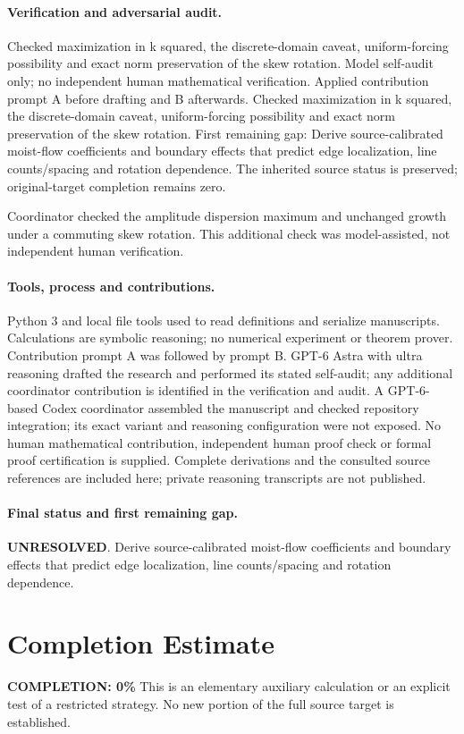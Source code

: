 \documentclass[11pt]{article}
\begin{document}
\paragraph{Verification and adversarial audit.}
Checked maximization in k squared, the discrete-domain caveat, uniform-forcing possibility and exact norm preservation of the skew rotation. Model self-audit only; no independent human mathematical verification. Applied contribution prompt A before drafting and B afterwards. Checked maximization in k squared, the discrete-domain caveat, uniform-forcing possibility and exact norm preservation of the skew rotation. First remaining gap: Derive source-calibrated moist-flow coefficients and boundary effects that predict edge localization, line counts/spacing and rotation dependence. The inherited source status is preserved; original-target completion remains zero.

Coordinator checked the amplitude dispersion maximum and unchanged growth under a commuting skew rotation. This additional check was model-assisted, not independent human verification.

\paragraph{Tools, process and contributions.}
Python 3 and local file tools used to read definitions and serialize manuscripts. Calculations are symbolic reasoning; no numerical experiment or theorem prover. Contribution prompt A was followed by prompt B. GPT-6 Astra with ultra reasoning drafted the research and performed its stated self-audit; any additional coordinator contribution is identified in the verification and audit. A GPT-6-based Codex coordinator assembled the manuscript and checked repository integration; its exact variant and reasoning configuration were not exposed. No human mathematical contribution, independent human proof check or formal proof certification is supplied. Complete derivations and the consulted source references are included here; private reasoning transcripts are not published.

\paragraph{Final status and first remaining gap.}
\textbf{UNRESOLVED}. Derive source-calibrated moist-flow coefficients and boundary effects that predict edge localization, line counts/spacing and rotation dependence.

\section{Completion Estimate}
\noindent\textbf{COMPLETION: 0\%}
This is an elementary auxiliary calculation or an explicit test of a restricted strategy. No new portion of the full source target is established.
\end{document}

